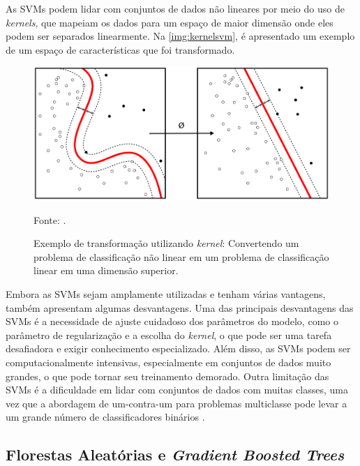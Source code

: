As SVMs podem lidar com conjuntos de dados não lineares por meio do uso de \textit{kernels}, que mapeiam os dados para um espaço de maior dimensão onde eles podem ser separados linearmente. Na \autoref{img:kernelsvm}, é apresentado um exemplo de um espaço de características que foi transformado.

\begin{figure}[htb]
	\centering
	\caption{\label{img:kernelsvm}Exemplo de transformação utilizando \textit{kernel}: Convertendo um problema de classificação não linear em um problema de classificação linear em uma dimensão superior.}
	\includegraphics[scale=0.5]{USPSC-img/Kernel_Machine.png}
	\begin{center}
		Fonte: \cite{wiki}.
	\end{center}
\end{figure}

Embora as SVMs sejam amplamente utilizadas e tenham várias vantagens, também apresentam algumas desvantagens. Uma das principais desvantagens das SVMs é a necessidade de ajuste cuidadoso dos parâmetros do modelo, como o parâmetro de regularização e a escolha do \textit{kernel}, o que pode ser uma tarefa desafiadora e exigir conhecimento especializado. Além disso, as SVMs podem ser computacionalmente intensivas, especialmente em conjuntos de dados muito grandes, o que pode tornar seu treinamento demorado. Outra limitação das SVMs é a dificuldade em lidar com conjuntos de dados com muitas classes, uma vez que a abordagem de um-contra-um para problemas multiclasse pode levar a um grande número de classificadores binários \cite{trevorHastie}.

\subsection{Florestas Aleatórias e \textit{Gradient Boosted Trees}}

